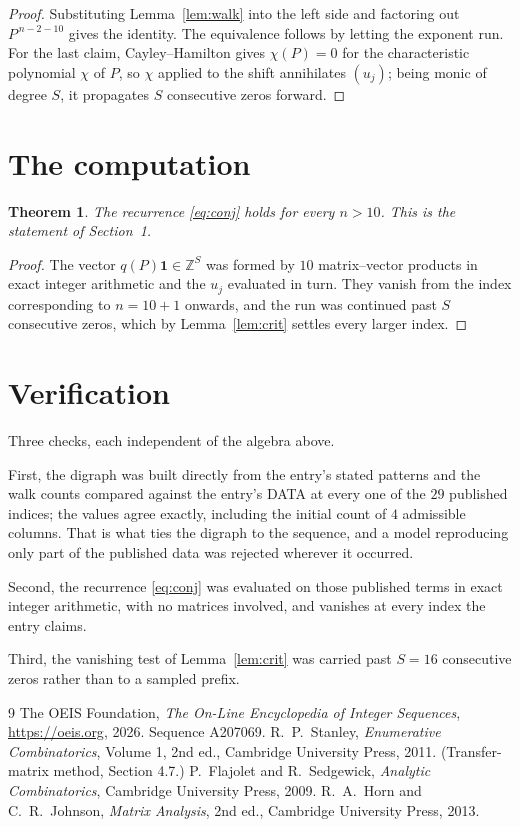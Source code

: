 \documentclass[11pt,a4paper]{article}
\theoremstyle{plain}
\newtheorem{theorem}{Theorem}
\theoremstyle{definition}
\begin{document}
\begin{proof}
Substituting Lemma~\ref{lem:walk} into the left side and factoring out
$P^{\,n-2-10}$ gives the identity. The equivalence follows by letting the exponent
run. For the last claim, Cayley--Hamilton gives $\chi(P)=0$ for the characteristic
polynomial $\chi$ of $P$, so $\chi$ applied to the shift annihilates $(u_j)$; being monic of
degree $S$, it propagates $S$ consecutive zeros forward.
\end{proof}

\section{The computation}

\begin{theorem}
The recurrence \eqref{eq:conj} holds for every $n>10$. This is the statement of
Section~1.
\end{theorem}

\begin{proof}
The vector $q(P)\mathbf{1}\in\mathbb{Z}^{S}$ was formed by $10$ matrix--vector
products in exact integer arithmetic and the $u_j$ evaluated in turn. They vanish from the
index corresponding to $n=10+1$ onwards, and the run was continued past $S$ consecutive
zeros, which by Lemma~\ref{lem:crit} settles every larger index.
\end{proof}

\section{Verification}

Three checks, each independent of the algebra above.

First, the digraph was built directly from the entry's stated patterns and the walk counts
compared against the entry's DATA at every one of the $29$ published indices; the
values agree exactly, including the initial count of $4$ admissible columns. That is
what ties the digraph to the sequence, and a model reproducing only part of the published
data was rejected wherever it occurred.

Second, the recurrence \eqref{eq:conj} was evaluated on those published terms in exact
integer arithmetic, with no matrices involved, and vanishes at every index the entry claims.

Third, the vanishing test of Lemma~\ref{lem:crit} was carried past $S=16$ consecutive
zeros rather than to a sampled prefix.

\begin{thebibliography}{9}
 The OEIS Foundation, \emph{The On-Line Encyclopedia of Integer
Sequences}, \url{https://oeis.org}, 2026. Sequence A207069.
 R.~P.~Stanley, \emph{Enumerative Combinatorics}, Volume 1, 2nd ed.,
Cambridge University Press, 2011. (Transfer-matrix method, Section 4.7.)
 P.~Flajolet and R.~Sedgewick, \emph{Analytic Combinatorics}, Cambridge
University Press, 2009.
 R.~A.~Horn and C.~R.~Johnson, \emph{Matrix Analysis}, 2nd ed., Cambridge
University Press, 2013.
\end{thebibliography}
\end{document}
